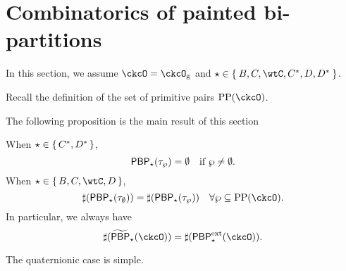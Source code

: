\documentclass[counting_main.tex]{subfiles}
\begin{document}
\section{Combinatorics of painted bi-partitions}

In this section, we assume $\ckcO = \ckcOg$ and $\star \in \Set{B,C,\wtC,C^{*},D,D^{*}}$.

Recall the definition of the set of primitive pairs $\CPP(\ckcO)$.

The following proposition is the main result of this section
\begin{prop} \label{prop:PBP}
  When $\star\in \set{C^{*}, D^{*}}$,
  \[
    \mathsf{PBP}_{\star}(\tau_{\wp}) = \emptyset \quad \text{if } \wp \neq \emptyset.
  \]
  When $\star\in \set{B,C,\wtC,D}$,
  \[
    \sharp(\PBP_{\star}(\tau_{\emptyset})) = \sharp(\PBP_{\star}(\tau_{\wp}))
    \quad \forall \wp \subseteq \CPP(\ckcO).
  \]
  In particular, we always have
  \[
    \sharp(\tPBP_{\star}(\ckcO))  = \sharp(\PBPe_{\star}(\ckcO)).
  \]
\end{prop}


The quaternionic case is simple.
\end{document}
